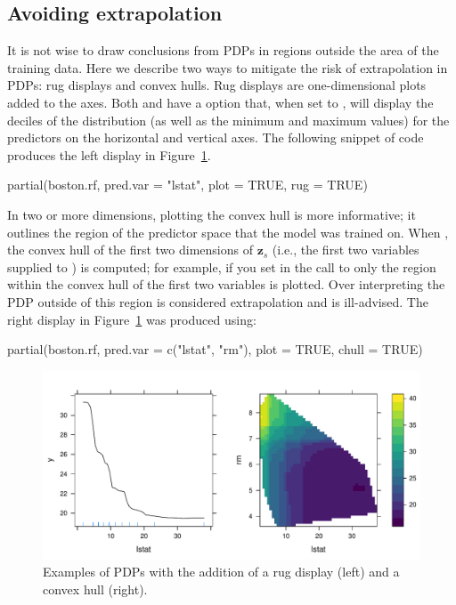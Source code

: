 \subsection{Avoiding extrapolation}

It is not wise to draw conclusions from PDPs in regions outside the area of the training data. Here we describe two ways to mitigate the risk of extrapolation in PDPs: rug displays and convex hulls. Rug displays are one-dimensional plots added to the axes. Both  and  have a  option that, when set to , will display the deciles of the distribution (as well as the minimum and maximum values) for the predictors on the horizontal and vertical axes. The following snippet of code produces the left display in Figure~\ref{fig:partial_extrap}.
\begin{example}
partial(boston.rf, pred.var = "lstat", plot = TRUE, rug = TRUE)
\end{example}

In two or more dimensions, plotting the convex hull is more informative; it outlines the region of the predictor space that the model was trained on. When , the convex hull of the first two dimensions of $\boldsymbol{z}_s$ (i.e., the first two variables supplied to ) is computed; for example, if you set  in the call to  only the region within the convex hull of the first two variables is plotted. Over interpreting the PDP outside of this region is considered extrapolation and is ill-advised. The right display in Figure~\ref{fig:partial_extrap} was produced using:
\begin{example}
partial(boston.rf, pred.var = c("lstat", "rm"), plot = TRUE, chull = TRUE)
\end{example}

\begin{figure}[!htbp]
  \centering
  \includegraphics[width=1.0\linewidth]{partial_extrap}
  \caption{Examples of PDPs with the addition of a rug display (left) and a convex hull (right).}
  \label{fig:partial_extrap}
\end{figure}


